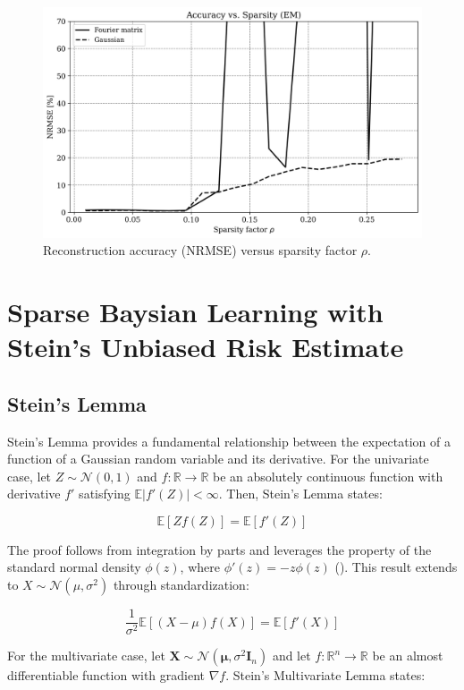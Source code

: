 \documentclass{article}
\begin{document}
\begin{figure}[H]
    \centering
    \includegraphics[width=0.75\linewidth]{Figures/accuracy_vs_sparsity_FFTGauss_EM.png}
    \caption{Reconstruction accuracy (NRMSE) versus sparsity factor $ \rho $.}
    \label{fig:accuracy_vs_sparsity_EM_gaussFFT}
\end{figure}


\section{Sparse Baysian Learning with Stein's Unbiased Risk Estimate}
\label{sec:SBL_SURE}
\subsection{Stein's Lemma}
Stein's Lemma provides a fundamental relationship between the expectation of a function of a Gaussian random variable and its derivative. For the univariate case, let $Z \sim \mathcal{N}(0, 1)$ and $f: \mathbb{R} \to \mathbb{R}$ be an absolutely continuous function with derivative $f'$ satisfying $\mathbb{E}|f'(Z)| < \infty$. Then, Stein's Lemma states:

\begin{equation}
    \mathbb{E}[Zf(Z)] = \mathbb{E}[f'(Z)]
\end{equation}

The proof follows from integration by parts and leverages the property of the standard normal density $\phi(z)$, where $\phi'(z) = -z\phi(z)$ (\citet{Tibshirani2015SteinS}). This result extends to $X \sim \mathcal{N}(\mu, \sigma^2)$ through standardization:

\begin{equation}
    \frac{1}{\sigma^2}\mathbb{E}[(X - \mu)f(X)] = \mathbb{E}[f'(X)]
\end{equation}

For the multivariate case, let $\mathbf{X} \sim \mathcal{N}(\boldsymbol{\mu}, \sigma^2 \mathbf{I}_n)$ and let $f: \mathbb{R}^n \to \mathbb{R}$ be an almost differentiable function with gradient $\nabla f$. Stein's Multivariate Lemma states:
\end{document}
